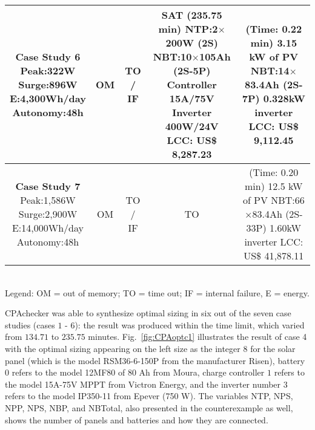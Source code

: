 \begin{table}
\begin{scriptsize}
\begin{tabular}{c|c|c|c|c}
\makecell{\textbf{Case Study 6}\\Peak:322W\\Surge:896W\\E:4,300Wh/day\\Autonomy:48h} & OM & TO / IF & \makecell {SAT (235.75 min) \\NTP:2$\times$200W (2S)\\NBT:10$\times$105Ah (2S-5P)\\Controller 15A/75V\\Inverter 400W/24V \\LCC: US\$ 8,287.23} & \makecell{(Time: 0.22 min)\\3.15 kW of PV\\NBT:14$\times$83.4Ah (2S-7P)\\0.328kW inverter\\LCC: US\$ 9,112.45} \\
\hline
\makecell{\textbf{Case Study 7}\\Peak:1,586W\\Surge:2,900W\\E:14,000Wh/day\\Autonomy:48h} & OM & TO / IF & TO & \makecell{(Time: 0.20 min)\\12.5 kW of PV\\NBT:66$\times$83.4Ah (2S-33P)\\1.60kW inverter\\LCC: US\$ 41,878.11} \\
\hline
\hline
\end{tabular}
\\Legend: OM = out of memory; TO = time out; IF = internal failure, E = energy.
\end{scriptsize}
\end{table}

CPAchecker was able to synthesize optimal sizing in six 
out of the seven case studies (cases $1$ - $6$): the result was produced within the time limit, which varied from $134.71$ to $235.75$ minutes. Fig.~\ref{fig:CPAoptc1} illustrates the result of case 4 with the optimal sizing appearing on the left size as the integer $8$ for the solar panel (which is the model RSM36-6-150P from the manufacturer Risen), battery $0$ refers to the model 12MF80 of 80 Ah from Moura, charge controller $1$ refers to the model 15A-75V MPPT from Victron  Energy, and the inverter number $3$ refers to the model IP350-11 from Epever (750 W). The variables NTP, NPS, NPP, NPS, NBP, and NBTotal, also presented in the counterexample as well, shows the number of panels and batteries and how they are connected.

